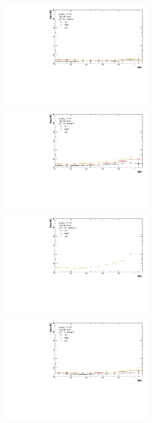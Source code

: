 \begin{figure}[h!]
    \centering
    \begin{multicols}{2}
            \includegraphics[width=7.5cm]{figures/TriggerBias/NEF/hNEF_ptBin0_R02.pdf}
            \includegraphics[width=7.5cm]{figures/TriggerBias/NEF/hNEF_ptBin2_R02.pdf}
            \includegraphics[width=7.5cm]{figures/TriggerBias/NEF/hNEF_ptBin4_R02.pdf}
        \vfill\null
        \columnbreak
            \includegraphics[width=7.5cm]{figures/TriggerBias/NEF/hNEF_ptBin1_R02.pdf}

\end{multicols}
\end{figure}
